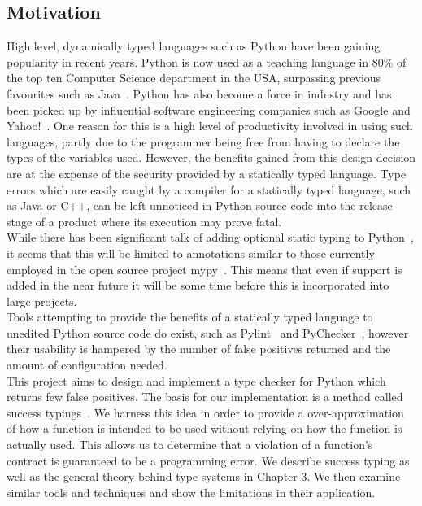 \documentclass[12pt, titlepage]{article}
\begin{document}
\subsection{Motivation}
High level, dynamically typed languages such as Python have been gaining popularity in recent years. Python is now used as a teaching language in 80\% of the top ten Computer Science department in the USA, surpassing previous favourites such as Java~\cite{guoTeaching}. Python has also become a force in industry and has been picked up by influential software engineering companies such as Google and Yahoo!~\cite{organisationsPython}. One reason for this is a high level of productivity involved in using such languages, partly due to the programmer being free from having to declare the types of the variables used. However, the benefits gained from this design decision are at the expense of the security provided by a statically typed language. Type errors which are easily caught by a compiler for a statically typed language, such as Java or C++, can be left unnoticed in Python source code into the release stage of a product where its execution may prove fatal. \\ %
\indent While there has been significant talk of adding optional static typing to Python~\cite{guido1, guido2, guido3, guidoLatest}, it seems that this will be limited to annotations similar to those currently employed in the open source project mypy~\cite{mypy}. This means that even if support is added in the near future it will be some time before this is incorporated into large projects. \\
\indent Tools attempting to provide the benefits of a statically typed language to unedited Python source code do exist, such as Pylint~\cite{pylint} and PyChecker~\cite{pychecker}, however their usability is hampered by the number of false positives returned and the amount of configuration needed. \\
\indent This project aims to design and implement a type checker for Python which returns few false positives. The basis for our implementation is a method called success typings~\cite{lindhal06}. We harness this idea in order to provide a over-approximation of how a function is intended to be used without relying on how the function is actually used. This allows us to determine that a violation of a function's contract is guaranteed to be a programming error. We describe success typing as well as the general theory behind type systems in Chapter 3. We then examine similar tools and techniques and show the limitations in their application. \\
\end{document}
